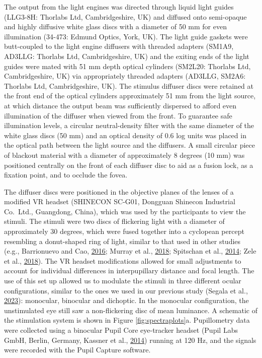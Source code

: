 \documentclass[
]{article}
\begin{document}
The output from the light engines was directed through liquid light guides (LLG3-8H: Thorlabs Ltd, Cambridgeshire, UK) and diffused onto semi-opaque and highly diffusive white glass discs with a diameter of 50 mm for even illumination (34-473: Edmund Optics, York, UK). The light guide gaskets were butt-coupled to the light engine diffusers with threaded adapters (SM1A9, AD3LLG: Thorlabs Ltd, Cambridgeshire, UK) and the exiting ends of the light guides were mated with 51 mm depth optical cylinders (SM2L20: Thorlabs Ltd, Cambridgeshire, UK) via appropriately threaded adapters (AD3LLG, SM2A6: Thorlabs Ltd, Cambridgeshire, UK). The stimulus diffuser discs were retained at the front end of the optical cylinders approximately 51 mm from the light source, at which distance the output beam was sufficiently dispersed to afford even illumination of the diffuser when viewed from the front. To guarantee safe illumination levels, a circular neutral-density filter with the same diameter of the white glass discs (50 mm) and an optical density of 0.6 log units was placed in the optical path between the light source and the diffusers. A small circular piece of blackout material with a diameter of approximately 8 degrees (10 mm) was positioned centrally on the front of each diffuser disc to aid as a fusion lock, as a fixation point, and to occlude the fovea.

The diffuser discs were positioned in the objective planes of the lenses of a modified VR headset (SHINECON SC-G01, Dongguan Shinecon Industrial Co.~Ltd., Guangdong, China), which was used by the participants to view the stimuli. The stimuli were two discs of flickering light with a diameter of approximately 30 degrees, which were fused together into a cyclopean percept resembling a donut-shaped ring of light, similar to that used in other studies (e.g., Barrionuevo and Cao, \protect\hyperlink{ref-Barrionuevo2016}{2016}; Murray et al., \protect\hyperlink{ref-Murray2018}{2018}; Spitschan et al., \protect\hyperlink{ref-Spitschan2014}{2014}; Zele et al., \protect\hyperlink{ref-Zele2018}{2018}). The VR headset modifications allowed for small adjustments to account for individual differences in interpupillary distance and focal length. The use of this set up allowed us to modulate the stimuli in three different ocular configurations, similar to the ones we used in our previous study (Segala et al., \protect\hyperlink{ref-Segala2023}{2023}): monocular, binocular and dichoptic. In the monocular configuration, the unstimulated eye still saw a non-flickering disc of mean luminance. A schematic of the stimulation system is shown in Figure \ref{fig:spectraplots}a. Pupillometry data were collected using a binocular Pupil Core eye-tracker headset (Pupil Labs GmbH, Berlin, Germany, Kassner et al., \protect\hyperlink{ref-Kassner2014}{2014}) running at 120 Hz, and the signals were recorded with the Pupil Capture software.
\end{document}
